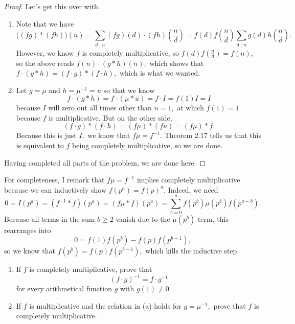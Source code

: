 \begin{proof}
Let's get this over with.
\begin{enumerate}[label=(\alph*)]
    \item Note that we have
    \[\big((fg)*(fh)\big)(n)=\sum_{d\mid n}(fg)(d)\cdot(fh)\left(\frac nd\right)=f(d)f\left(\frac nd\right)\sum_{d\mid n}g(d)h\left(\frac nd\right).\]
    However, we know $f$ is completely multiplicative, so $f(d)f\left(\frac nd\right)=f(n),$ so the above reads $f(n)\cdot(g*h)(n),$ which shows that $f\cdot(g*h)=(f\cdot g)*(f\cdot h),$ which is what we wanted.
    \item Let $g=\mu$ and $h=\mu^{-1}=u$ so that we know
    \[f\cdot(g*h)=f\cdot(\mu*u)=f\cdot I=f(1)I=I\]
    because $I$ will zero out all times other than $n=1,$ at which $f(1)=1$ because $f$ is multiplicative. But on the other side,
    \[(f\cdot g)*(f\cdot h)=(f\mu)*(fu)=(f\mu)*f.\]
    Because this is just $I,$ we know that $f\mu=f^{-1}.$ Theorem 2.17 tells us that this is equivalent to $f$ being completely multiplicative, so we are done.
\end{enumerate}
Having completed all parts of the problem, we are done here.
\end{proof}

For completeness, I remark that $f\mu=f^{-1}$ implies completely multiplicative because we can inductively show $f\left(p^a\right)=f(p)^a.$ Indeed, we need
\[0=I\left(p^a\right)=\left(f^{-1}*f\right)\left(p^a\right)=(f\mu*f)\left(p^a\right)=\sum_{b=0}^af\left(p^b\right)\mu\left(p^b\right)f\left(p^{a-b}\right).\]
Because all terms in the sum $b\ge2$ vanish due to the $\mu\left(p^b\right)$ term, this rearranges into
\[0=f(1)f\left(p^b\right)-f(p)f\left(p^{b-1}\right),\]
so we know that $f\left(p^b\right)=f(p)f\left(p^{b-1}\right),$ which kills the inductive step.

\begin{exercise}
\begin{enumerate}[label=(\alph*)]
    \item If $f$ is completely multiplicative, prove that
    \[(f\cdot g)^{-1}=f\cdot g^{-1}\]
    for every arithmetical function $g$ with $g(1)\ne0.$
    \item If $f$ is multiplicative and the relation in (a) holds for $g=\mu^{-1},$ prove that $f$ is completely multiplicative.
\end{enumerate}
\end{exercise}

